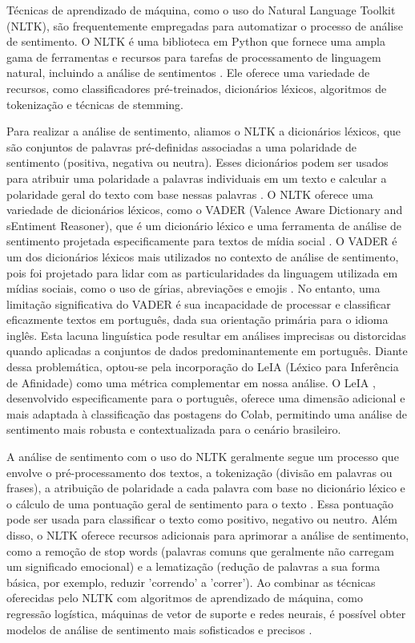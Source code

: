 Técnicas de aprendizado de máquina, como o uso do Natural Language Toolkit (NLTK), são frequentemente empregadas para automatizar o processo de análise de sentimento. O NLTK é uma biblioteca em Python que fornece uma ampla gama de ferramentas e recursos para tarefas de processamento de linguagem natural, incluindo a análise de sentimentos \cite{2009_Bird_BOOK}. Ele oferece uma variedade de recursos, como classificadores pré-treinados, dicionários léxicos, algoritmos de tokenização e técnicas de stemming.

Para realizar a análise de sentimento, aliamos o NLTK a dicionários léxicos, que são conjuntos de palavras pré-definidas associadas a uma polaridade de sentimento (positiva, negativa ou neutra). Esses dicionários podem ser usados para atribuir uma polaridade a palavras individuais em um texto e calcular a polaridade geral do texto com base nessas palavras \cite{2012_Souza_IP}. O NLTK oferece uma variedade de dicionários léxicos, como o VADER (Valence Aware Dictionary and sEntiment Reasoner), que é um dicionário léxico e uma ferramenta de análise de sentimento projetada especificamente para textos de mídia social \cite{2014_Hutto}. O VADER é um dos dicionários léxicos mais utilizados no contexto de análise de sentimento, pois foi projetado para lidar com as particularidades da linguagem utilizada em mídias sociais, como o uso de gírias, abreviações e emojis \cite{2014_Hutto}. No entanto, uma limitação significativa do VADER é sua incapacidade de processar e classificar eficazmente textos em português, dada sua orientação primária para o idioma inglês. Esta lacuna linguística pode resultar em análises imprecisas ou distorcidas quando aplicadas a conjuntos de dados predominantemente em português. Diante dessa problemática, optou-se pela incorporação do LeIA (Léxico para Inferência de Afinidade) como uma métrica complementar em nossa análise. O LeIA \cite{2018_Almeida_PAGE}, desenvolvido especificamente para o português, oferece uma dimensão adicional e mais adaptada à classificação das postagens do Colab, permitindo uma análise de sentimento mais robusta e contextualizada para o cenário brasileiro.

A análise de sentimento com o uso do NLTK geralmente segue um processo que envolve o pré-processamento dos textos, a tokenização (divisão em palavras ou frases), a atribuição de polaridade a cada palavra com base no dicionário léxico e o cálculo de uma pontuação geral de sentimento para o texto \cite{2013_Haddi}. Essa pontuação pode ser usada para classificar o texto como positivo, negativo ou neutro. Além disso, o NLTK oferece recursos adicionais para aprimorar a análise de sentimento, como a remoção de stop words (palavras comuns que geralmente não carregam um significado emocional) e a lematização (redução de palavras a sua forma básica, por exemplo, reduzir 'correndo' a 'correr'). Ao combinar as técnicas oferecidas pelo NLTK com algoritmos de aprendizado de máquina, como regressão logística, máquinas de vetor de suporte e redes neurais, é possível obter modelos de análise de sentimento mais sofisticados e precisos \cite{2014_Kim}.

